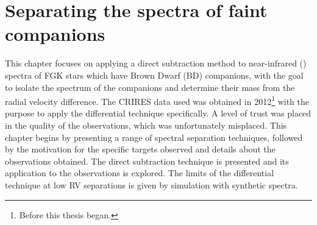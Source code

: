 
\chapter{Separating the spectra of faint companions} %
\label{cha:direct_recovery}

This chapter focuses on applying a direct subtraction method to near-infrared (\nir{}) spectra of {FGK} stars which have Brown Dwarf (BD) companions, with the goal to isolate the spectrum of the companions and determine their mass from the radial velocity difference.
The {CRIRES} data used was obtained in 2012\footnote{Before this thesis began.} with the purpose to apply the differential technique specifically.
A level of trust was placed in the quality of the observations, which was unfortunately misplaced.
This chapter begins by presenting a range of spectral separation techniques, followed by the motivation for the specific targets observed and details about the observations obtained.
The direct subtraction technique is presented and its application to the observations is explored.
The limits of the differential technique at low {RV} separations is given by simulation with synthetic spectra.























